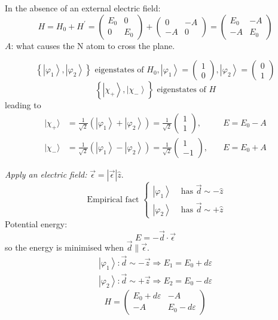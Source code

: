 \documentclass[12pt]{article}
\newcommand{\be}{\begin{equation}}
\newcommand{\ee}{\end{equation}}
\begin{document}
In the absence of an external electric field:
\be
H=H_{0}+H^{\prime}=
\begin{pmatrix}
E_{0} & 0 \\ 0 & E_{0}
\end{pmatrix}
+
\begin{pmatrix}
0 &-A \\ -A & 0
\end{pmatrix}
=
\begin{pmatrix}
E_{0} & -A \\ -A & E_{0}
\end{pmatrix}
\ee
$A$: what causes the N atom to cross the plane.

\be
\left\{\left|\varphi_{1}\right\rangle,\left|\varphi_{2}\right\rangle\right\} 
\text { eigenstates of } H_{0},
\left|\varphi_{1}\right\rangle=\left(\begin{array}{l}1 \\ 0\end{array}\right), 
\left|\varphi_{2}\right\rangle=\left(\begin{array}{l}0 \\ 1\end{array}\right)
\ee
%
\[
\left\{\left|\chi_{+}\right\rangle,\left|\chi_{-}\right\rangle\right\}  
\text { eigenstates of } H
\]
leading to
\[
\begin{aligned}
|\chi_{+}\rangle&=\frac{1}{\sqrt{2}}\left(\left|\varphi_{1}\right\rangle+\left|\varphi_{2}\right\rangle\right)=\frac{1}{\sqrt{2}}\begin{pmatrix}1 \\ 1\end{pmatrix}, 
&\quad E=E_{0}-A \\
|\chi_{-}\rangle&=\frac{1}{\sqrt{2}}\left(\left| \varphi_{1}\right\rangle-\left|\varphi_{2}\right\rangle\right)=\frac{1}{\sqrt{2}}\begin{pmatrix}1 \\ -1\end{pmatrix},
&\quad E=E_{0}+A
\end{aligned}
\]

\setcounter{equation}{62}

\emph{Apply an electric field:} $\vec{\epsilon} = |\vec{\epsilon}|\hat{z}$.
\[
\text { Empirical fact }\left\{\begin{array}{ll}\left|\varphi_{1}\right\rangle & \text { has } \vec{d} \sim-\hat{z} \\ \left|\varphi_{2}\right\rangle & \text { has } \vec{d} \sim+\hat{z}\end{array}\right.
\]
Potential energy:
\be
E = -\vec{d}\cdot\vec{\epsilon}
\ee
so the energy is minimised when $\vec{d} \parallel \vec{\epsilon}$.
\be
\begin{array}{l}
\left|\varphi_{1}\right\rangle: \vec{d} \sim-\vec{z} \Rightarrow E_{1}=E_{0}+d \varepsilon \\ 
\left|\varphi_{2}\right\rangle: \vec{d} \sim+\vec{z} \Rightarrow E_{2}=E_{0}-d \varepsilon
\end{array}
\ee
\be
H=\left(\begin{array}{cc}E_{0}+d \varepsilon & -A \\ -A & E_{0}-d \varepsilon\end{array}\right)
\ee
\end{document}

